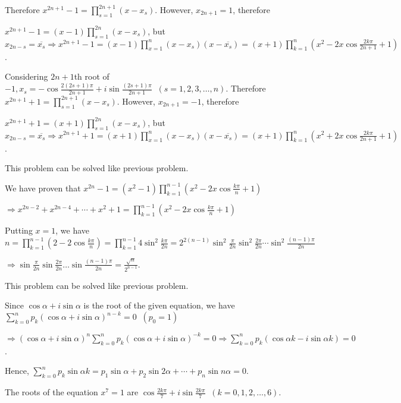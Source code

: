   Therefore $x^{2n + 1} - 1 = \displaystyle\prod_{s = 1}^{2n + 1}(x - x_s)$. However, $x_{2n + 1} = 1$,
  therefore

  $x^{2n + 1} - 1 = \displaystyle(x - 1)\prod_{s=1}^{2n}(x - x_s)$, but $x_{2n - s} = \displaystyle\overline{x_s}
  \Rightarrow x^{2n + 1} - 1 = (x - 1)\prod_{x=1}^{n}(x - x_s)(x - \overline{x_s}) = (x +
  1)\displaystyle\prod_{k = 1}^n\left(x^2 - 2x\cos\frac{2k\pi}{2n + 1} + 1\right)$.
\item Considering $2n + 1$th root of $-1, x_s = -\cos\frac{2(2s + 1)\pi}{2n + 1} + i\sin\frac{(2s +
  1)\pi}{2n + 1}\;\;(s = 1, 2, 3, \ldots, n)$.
  Therefore $x^{2n + 1} + 1 = \displaystyle\prod_{s = 1}^{2n + 1}(x - x_s)$. However, $x_{2n + 1} = -1$,
  therefore

  $x^{2n + 1} + 1 = \displaystyle(x + 1)\prod_{s=1}^{2n}(x - x_s)$, but $x_{2n - s} = \displaystyle\overline{x_s}
  \Rightarrow x^{2n + 1} + 1 = (x + 1)\prod_{x=1}^{n}(x - x_s)(x - \overline{x_s}) = (x +
  1)\displaystyle\prod_{k = 1}^n\left(x^2 + 2x\cos\frac{2k\pi}{2n + 1} + 1\right)$.
\item This problem can be solved like previous problem.
\item We have proven that $x^{2n} - 1 = (x^2 - 1)\displaystyle\prod_{k = 1}^{n - 1}\left(x^2 -
  2x\cos\frac{k\pi}{n} + 1\right)$

  $\Rightarrow x^{2n - 2} + x^{2n - 4} + \cdots + x^2 + 1 = \displaystyle\prod_{k = 1}^{n - 1}\left(x^2 -
  2x\cos\frac{k\pi}{n} + 1\right)$

  Putting $x = 1$, we have $n = \displaystyle\prod_{k = 1}^{n - 1}\left(2 - 2\cos\frac{k\pi}{n}\right) = \prod_{k=1}^{n
  - 1}4\sin^2\frac{k\pi}{2n} = 2^{2(n - 1)}\sin^2\frac{\pi}{2n}\sin^2\frac{2\pi}{2n}\cdots\sin^2\frac{(n -
    1)\pi}{2n}$

  $\Rightarrow \sin\frac{\pi}{2n}\sin\frac{2\pi}{2n}\ldots \sin\frac{(n - 1)\pi}{2n} = \frac{\sqrt{n}}{2^{n
      - 1}}$.
\item This problem can be solved like previous problem.
\item Since $\cos\alpha + i\sin\alpha$ is the root of the given equation, we have $\displaystyle\sum_{k =
  0}^np_k(\cos\alpha + i\sin\alpha)^{n - k} = 0\;\;(p_0 = 1)$

  $\Rightarrow \displaystyle(\cos\alpha + i\sin\alpha)^n\sum_{k=0}^np_k(\cos\alpha + i\sin\alpha)^{-k} = 0 \Rightarrow
  \sum_{k= 0}^np_k(\cos\alpha k - i\sin\alpha k) = 0$.

  Hence, $\displaystyle\sum_{k= 0}^np_k\sin\alpha k = p_1\sin\alpha + p_2\sin2\alpha + \cdots + p_n\sin
  n\alpha = 0$.
\item The roots of the equation $x^7 = 1$ are $\cos\frac{2k\pi}{7} + i\sin\frac{2k\pi}{7}\;\;(k = 0, 1, 2,
  \ldots, 6)$.

